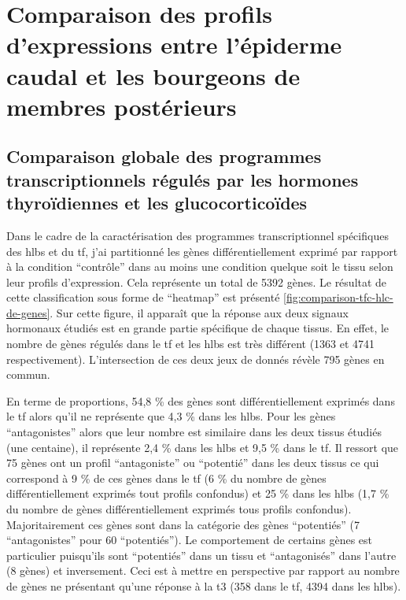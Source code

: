 \documentclass[../main.tex]{subfiles}
\begin{document}
\chapter{Comparaison des profils d'expressions entre l'épiderme caudal et les bourgeons de membres postérieurs}

\section{Comparaison globale des programmes transcriptionnels régulés par les hormones thyroïdiennes et les glucocorticoïdes}

	Dans le cadre de la caractérisation des programmes transcriptionnel spécifiques des \glspl{hlb} et du \gls{tf}, j'ai partitionné les gènes différentiellement exprimé par rapport à la condition ``contrôle'' dans au moins une condition quelque soit le tissu selon leur profils d'expression.
	Cela représente un total de 5392 gènes.
	Le résultat de cette classification sous forme de ``heatmap'' est présenté \autoref{fig:comparison-tfc-hlc-de-genes}.
	Sur cette figure, il apparaît que la réponse aux deux signaux hormonaux étudiés est en grande partie spécifique de chaque tissus.
	En effet, le nombre de gènes régulés dans le \gls{tf} et les \glspl{hlb} est très différent (1363 et 4741 respectivement).
	L'intersection de ces deux jeux de donnés révèle 795 gènes en commun.
	\par
	En terme de proportions, 54,8 \% des gènes sont différentiellement exprimés dans le \gls{tf} alors qu'il ne représente que 4,3 \% dans les \glspl{hlb}.
	Pour les gènes ``antagonistes'' alors que leur nombre est similaire dans les deux tissus étudiés (une centaine), il représente 2,4 \% dans les \glspl{hlb} et 9,5 \% dans le \gls{tf}.
	Il ressort que 75 gènes ont un profil ``antagoniste'' ou ``potentié'' dans les deux tissus ce qui correspond à 9 \% de ces gènes dans le \gls{tf} (6 \% du nombre de gènes différentiellement exprimés tout profils confondus) et 25 \% dans les \glspl{hlb} (1,7 \% du nombre de gènes différentiellement exprimés tous profils confondus).
	Majoritairement ces gènes sont dans la catégorie des gènes ``potentiés'' (7 ``antagonistes'' pour 60 ``potentiés'').
	Le comportement de certains gènes est particulier puisqu'ils sont ``potentiés'' dans un tissu et ``antagonisés'' dans l'autre (8 gènes) et inversement.
	Ceci est à mettre en perspective par rapport au nombre de gènes ne présentant qu'une réponse à la \gls{t3} (358 dans le \gls{tf}, 4394 dans les \glspl{hlb}).
	\par
\end{document}
